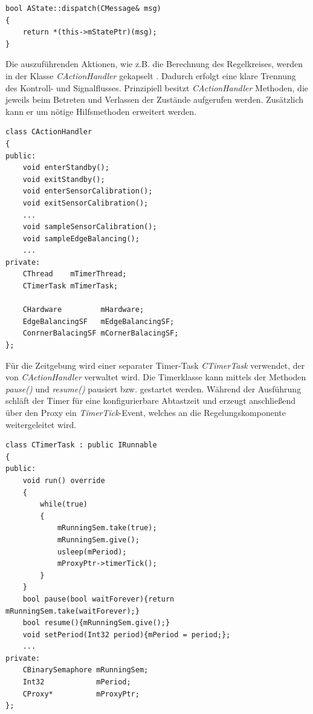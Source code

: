 \begin{lstlisting}[caption={Defintion der \textit{dispatch()}-Methode},captionpos=b]
bool AState::dispatch(CMessage& msg)
{
	return *(this->mStatePtr)(msg);
}
\end{lstlisting} 

Die auszuführenden Aktionen, wie z.B. die Berechnung des Regelkreises, werden in der Klasse \textit{CActionHandler} gekapselt \cite[S. 225]{Wietzke1}. Dadurch erfolgt eine klare Trennung des Kontroll- und Signalflusses. Prinzipiell besitzt \textit{CActionHandler} Methoden, die jeweils beim Betreten und Verlassen der Zustände aufgerufen werden. Zusätzlich kann er um nötige Hilfsmethoden erweitert werden.
\begin{lstlisting}[caption={Beispielhafte Implementierung des Actionhandlers},captionpos=b]
class CActionHandler
{
public:
	void enterStandby();
	void exitStandby();
	void enterSensorCalibration();
	void exitSensorCalibration();
	...
	void sampleSensorCalibration();
	void sampleEdgeBalancing();
	...
private:
	CThread    mTimerThread;
	CTimerTask mTimerTask;
	
	CHardware         mHardware;
	EdgeBalancingSF   mEdgeBalancingSF;
	ConrnerBalacingSF mCornerBalacingSF;
};
\end{lstlisting}
Für die Zeitgebung wird einer separater Timer-Task \textit{CTimerTask} verwendet, der von \textit{CActionHandler} verwaltet wird. Die Timerklasse kann mittels der Methoden \textit{pause()} und \textit{resume()} pausiert bzw. gestartet werden. Während der Ausführung schläft der Timer für eine konfigurierbare Abtastzeit und erzeugt anschließend über den Proxy ein \textit{TimerTick}-Event, welches an die Regelungskomponente weitergeleitet wird.
\begin{lstlisting}[caption={Aufbau des Timer-Tasks},captionpos=b]
class CTimerTask : public IRunnable
{
public:
	void run() override
	{
		while(true)
		{
			mRunningSem.take(true);
			mRunningSem.give();
			usleep(mPeriod);
			mProxyPtr->timerTick();
		}
	}
	bool pause(bool waitForever){return mRunningSem.take(waitForever);}
	bool resume(){mRunningSem.give();}
	void setPeriod(Int32 period){mPeriod = period;};
	...
private:
	CBinarySemaphore mRunningSem;
	Int32            mPeriod;
	CProxy*          mProxyPtr;
};
\end{lstlisting}
